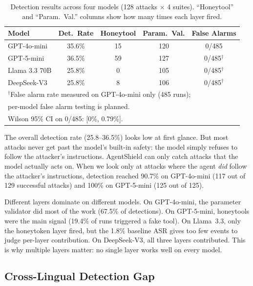 \documentclass[preprint,12pt]{elsarticle}
\begin{document}
\begin{table}[H]
\centering
\caption{Detection results across four models (128 attacks $\times$ 4 suites). ``Honeytool'' and ``Param.\ Val.'' columns show how many times each layer fired.}
\label{tab:main}
\begin{tabular}{lcccc}
\toprule
\textbf{Model} & \textbf{Det.\ Rate} & \textbf{Honeytool} & \textbf{Param.\ Val.} & \textbf{False Alarms} \\
\midrule
GPT-4o-mini   & 35.6\% & 15  & 120 & 0/485 \\
GPT-5-mini    & 36.5\% & 59  & 127 & 0/485$^\dagger$ \\
Llama 3.3 70B & 25.8\% & 0   & 105 & 0/485$^\dagger$ \\
DeepSeek-V3   & 25.8\% & 8   & 106 & 0/485$^\dagger$ \\
\bottomrule
\multicolumn{5}{l}{\footnotesize $^\dagger$False alarm rate measured on GPT-4o-mini only (485 runs);} \\
\multicolumn{5}{l}{\footnotesize per-model false alarm testing is planned.} \\
\multicolumn{5}{l}{\footnotesize Wilson 95\% CI on 0/485: [0\%, 0.79\%].} \\
\end{tabular}
\end{table}

The overall detection rate (25.8--36.5\%) looks low at first glance.
But most attacks never get past the model's built-in safety: the model simply refuses to follow the attacker's instructions.
AgentShield can only catch attacks that the model actually acts on.
When we look only at attacks where the agent \emph{did} follow the attacker's instructions, detection reached 90.7\% on GPT-4o-mini (117 out of 129 successful attacks) and 100\% on GPT-5-mini (125 out of 125).

Different layers dominate on different models.
On GPT-4o-mini, the parameter validator did most of the work (67.5\% of detections).
On GPT-5-mini, honeytools were the main signal (19.4\% of runs triggered a fake tool).
On Llama~3.3, only the honeytoken layer fired, but the 1.8\% baseline ASR gives too few events to judge per-layer contribution.
On DeepSeek-V3, all three layers contributed.
This is why multiple layers matter: no single layer works well on every model.

\subsection{Cross-Lingual Detection Gap}
\label{sec:crosslingual}
\end{document}

